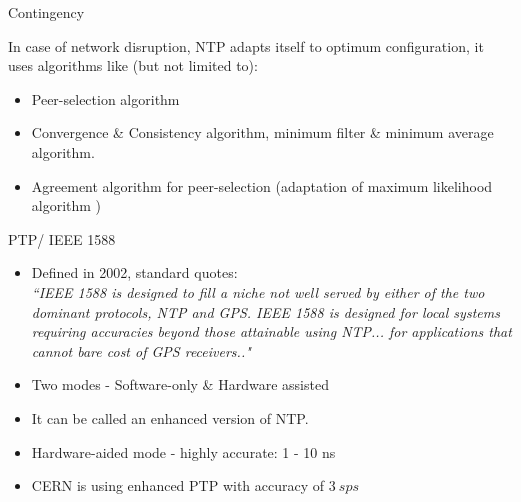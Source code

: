 \documentclass{beamer}
\begin{document}
   \begin{frame}{Contingency}
   	\begin{figure}
   	\end{figure}
   	In case of network disruption, NTP adapts itself to optimum configuration, it uses algorithms like (but not limited to): 
   	\begin{itemize}
   		\item Peer-selection algorithm
   		\item Convergence \& Consistency algorithm, minimum filter \& minimum average algorithm.
   		\item Agreement algorithm for peer-selection (adaptation of maximum likelihood algorithm )
   	\end{itemize} 
   \end{frame}

   \begin{frame}{PTP/ IEEE 1588}
   	\begin{itemize}
   		\item Defined in 2002, standard quotes:\\
   		 {\small \textit{``IEEE 1588 is designed to fill a niche \alert{not well served} by either of the two dominant protocols, NTP and GPS. IEEE 1588 is designed for \alert{local systems} requiring accuracies beyond those attainable using NTP... for applications that \alert{cannot bare cost of GPS} receivers.." }}
   		\item {\normalsize Two modes} - Software-only \& Hardware assisted
   		\item It can be called an enhanced version of NTP.
   		\item Hardware-aided mode - highly accurate: 1 - 10 ns
   		\item CERN is using enhanced PTP with accuracy of $3~sps$ 
   	\end{itemize}

   \end{frame}
   
\end{document}
